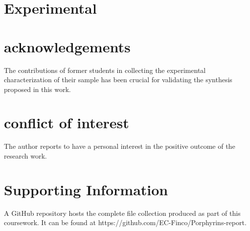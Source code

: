 \documentclass[num-refs]{wiley-article}
\begin{document}
\section{Experimental}

\section*{acknowledgements}
The contributions of former students in collecting the experimental characterization of their sample has been crucial for validating the synthesis proposed in this work.
\section*{conflict of interest}
The author reports to have a personal interest in the positive outcome of the research work.
\section*{Supporting Information}
A GitHub repository hosts the complete file collection produced as part of this coursework.
It can be found at https://github.com/EC-Finco/Porphyrins-report.
\printendnotes



\end{document}
